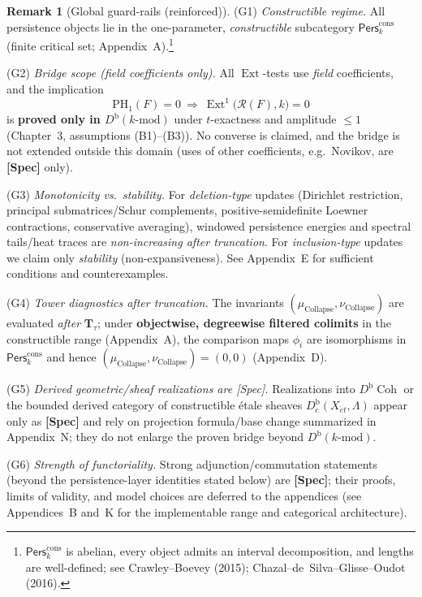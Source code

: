 \documentclass[11pt]{article}
\DeclareMathOperator{\Ext}{Ext}
\newcommand{\Pers}{\mathsf{Pers}}
\numberwithin{equation}{section}
\theoremstyle{definition}
\newtheorem{remark}[theorem]{Remark}
\begin{document}
\begin{remark}[Global guard-rails (reinforced)]\label{rk:global-guards}
(G1) \emph{Constructible regime.} All persistence objects lie in the one-parameter, \emph{constructible} subcategory $\Pers^{\mathrm{cons}}_k$ (finite critical set; Appendix~A).\footnote{$\Pers^{\mathrm{cons}}_k$ is abelian, every object admits an interval decomposition, and lengths are well-defined; see Crawley--Boevey (2015); Chazal--de~Silva--Glisse--Oudot (2016).}

(G2) \emph{Bridge scope (field coefficients only).} All $\Ext$-tests use \emph{field} coefficients, and the implication
\[
\mathrm{PH}_1(F)=0\ \Longrightarrow\ \Ext^1\!\big(\mathcal{R}(F),k\big)=0
\]
is \textbf{proved only in $D^{\mathrm{b}}(k\text{-mod})$} under $t$-exactness and amplitude $\le 1$ (Chapter~3, assumptions (B1)–(B3)). No converse is claimed, and the bridge is not extended outside this domain (uses of other coefficients, e.g.\ Novikov, are \textbf{[Spec]} only).

(G3) \emph{Monotonicity vs.\ stability.} For \emph{deletion-type} updates (Dirichlet restriction, principal submatrices/Schur complements, positive-semidefinite Loewner contractions, conservative averaging), windowed persistence energies and spectral tails/heat traces are \emph{non-increasing after truncation}. For \emph{inclusion-type} updates we claim only \emph{stability} (non-expansiveness). See Appendix~E for sufficient conditions and counterexamples.

(G4) \emph{Tower diagnostics after truncation.} The invariants $(\mu_{\mathrm{Collapse}},\nu_{\mathrm{Collapse}})$ are evaluated \emph{after} $\mathbf{T}_\tau$; under \textbf{objectwise, degreewise filtered colimits} in the constructible range (Appendix~A), the comparison maps $\phi_i$ are isomorphisms in $\Pers^{\mathrm{cons}}_k$ and hence $(\mu_{\mathrm{Collapse}},\nu_{\mathrm{Collapse}})=(0,0)$ (Appendix~D).

(G5) \emph{Derived geometric/sheaf realizations are [Spec].} Realizations into $D^{\mathrm{b}}\!\operatorname{Coh}$ or the bounded derived category of constructible étale sheaves $D^{\mathrm{b}}_{\mathrm{c}}(X_{\acute{e}t},\Lambda)$ appear only as \textbf{[Spec]} and rely on projection formula/base change summarized in Appendix~N; they do not enlarge the proven bridge beyond $D^{\mathrm{b}}(k\text{-mod})$.

(G6) \emph{Strength of functoriality.} Strong adjunction/commutation statements (beyond the persistence-layer identities stated below) are \textbf{[Spec]}; their proofs, limits of validity, and model choices are deferred to the appendices (see Appendices~B and~K for the implementable range and categorical architecture).


\end{remark}
\end{document}
